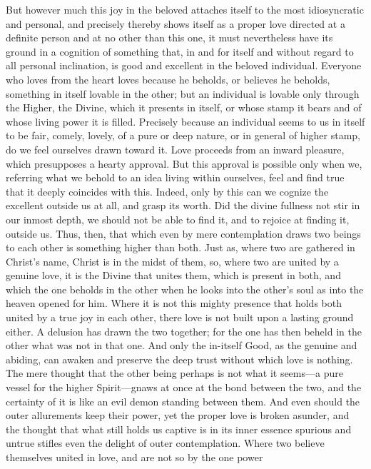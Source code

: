 \documentclass[12pt,a4paper]{book}
\begin{document}
But however much this joy in the beloved attaches itself to the most
idiosyncratic and personal, and precisely thereby shows itself as a
proper love directed at a definite person and at no other than this one,
it must nevertheless have its ground in a cognition of something that, in
and for itself and without regard to all personal inclination, is good and
excellent in the beloved individual. Everyone who loves from the heart
loves because he beholds, or believes he beholds, something in itself
lovable in the other; but an individual is lovable only through the
Higher, the Divine, which it presents in itself, or whose stamp it bears
and of whose living power it is filled. Precisely because an individual
seems to us in itself to be fair, comely, lovely, of a pure or deep
nature, or in general of higher stamp, do we feel ourselves drawn toward
it. Love proceeds from an inward pleasure, which presupposes a hearty
approval. But this approval is possible only when we, referring what we
behold to an idea living within ourselves, feel and find true that it
deeply coincides with this. Indeed, only by this can we cognize the
excellent outside us at all, and grasp its worth. Did the divine fullness
not stir in our inmost depth, we should not be able to find it, and to
rejoice at finding it, outside us. Thus, then, that which even by mere
contemplation draws two beings to each other is something higher than
both. Just as, where two are gathered in Christ's name, Christ is in the
midst of them, so, where two are united by a genuine love, it is the
Divine that unites them, which is present in both, and which the one
beholds in the other when he looks into the other's soul as into the
heaven opened for him. Where it is not this mighty presence that holds
both united by a true joy in each other, there love is not built upon a
lasting ground either. A delusion has drawn the two together; for the one
has then beheld in the other what was not in that one. And only the
in-itself Good, as the genuine and abiding, can awaken and preserve the
deep trust without which love is nothing. The mere thought that the other
being perhaps is not what it seems---a pure vessel for the higher
Spirit---gnaws at once at the bond between the two, and the certainty of
it is like an evil demon standing between them. And even should the outer
allurements keep their power, yet the proper love is broken asunder, and
the thought that what still holds us captive is in its inner essence
spurious and untrue stifles even the delight of outer contemplation. Where
two believe themselves united in love, and are not so by the one power
\end{document}
